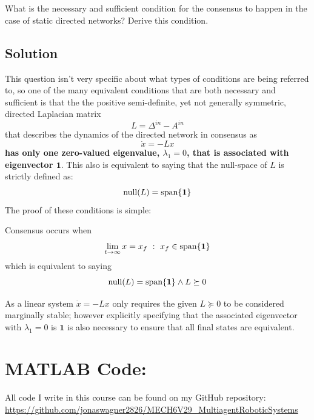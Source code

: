 \documentclass[]{article}
\numberwithin{equation}{section}
\newcommand{\st}{\ : \ }
\begin{document}
\section{}
What is the necessary and sufficient condition for the consensus to happen in the case of static directed networks? 
Derive this condition.

\subsection{Solution}
This question isn't very specific about what types of conditions are being referred to, so one of the many equivalent conditions that are both necessary and sufficient is that the the positive semi-definite, yet not generally symmetric, directed Laplacian matrix \[
	L = \Delta^{in} - A^{in}
\] that describes the dynamics of the directed network in consensus as\[
	\dot{x} = - L x
\]\textbf{ has only one zero-valued eigenvalue, $\lambda_1 = 0$, that is associated with eigenvector $\mathbf{1}$}.
This also is equivalent to saying that the null-space of $L$ is strictly defined as:\[
	\textnormal{null}\qty(L) = \textnormal{span}\qty{\mathbf{1}}
\] The proof of these conditions is simple:

Consensus occurs when\[
	\lim_{t \to \infty} x = x_f \st x_f \in \textnormal{span}\qty{\mathbf{1}}
\] which is equivalent to saying \[
	\textnormal{null}\qty(L) = \textnormal{span}\qty{\mathbf{1}} 
	\land L \succeq 0
\]

As a linear system $\dot{x} = -L x$ only requires the given $L \succeq 0$ to be considered marginally stable; however explicitly specifying that the associated eigenvector with $\lambda_1 = 0$ is $\mathbf{1}$ is also necessary to ensure that all final states are equivalent.

\newpage
\appendix
\section{MATLAB Code:}\label{apx:matlab}
All code I write in this course can be found on my GitHub repository:\\
\href{https://github.com/jonaswagner2826/MECH6V29_MultiagentRoboticSystems}{https://github.com/jonaswagner2826/MECH6V29\_MultiagentRoboticSystems}



\cite{*}
\end{document}
